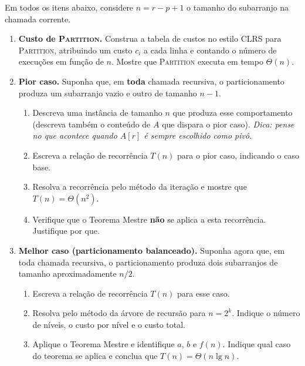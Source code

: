 \documentclass[9pt,a4paper]{extarticle}
\begin{document}
\begin{enumerate}[resume]
    Em todos os itens abaixo, considere $n = r - p + 1$ o tamanho do subarranjo na chamada corrente.

    \begin{enumerate}
        \item \textbf{Custo de \textsc{Partition}.} Construa a tabela de custos no estilo CLRS para \textsc{Partition}, atribuindo um custo $c_i$ a cada linha e contando o número de execuções em função de $n$. Mostre que \textsc{Partition} executa em tempo $\Theta(n)$.

        \item \textbf{Pior caso.} Suponha que, em \textbf{toda} chamada recursiva, o particionamento produza um subarranjo vazio e outro de tamanho $n - 1$.
        \begin{enumerate}
            \item Descreva uma instância de tamanho $n$ que produza esse comportamento (descreva também o conteúdo de $A$ que dispara o pior caso). \textit{Dica: pense no que acontece quando $A[r]$ é sempre escolhido como pivô.}
            \item Escreva a relação de recorrência $T(n)$ para o pior caso, indicando o caso base.
            \item Resolva a recorrência pelo método da iteração e mostre que $T(n) = \Theta(n^2)$.
            \item Verifique que o Teorema Mestre \textbf{não} se aplica a esta recorrência. Justifique por que.
        \end{enumerate}

        \item \textbf{Melhor caso (particionamento balanceado).} Suponha agora que, em toda chamada recursiva, o particionamento produza dois subarranjos de tamanho aproximadamente $n/2$.
        \begin{enumerate}
            \item Escreva a relação de recorrência $T(n)$ para esse caso.
            \item Resolva pelo método da árvore de recursão para $n = 2^k$. Indique o número de níveis, o custo por nível e o custo total.
            \item Aplique o Teorema Mestre e identifique $a$, $b$ e $f(n)$. Indique qual caso do teorema se aplica e conclua que $T(n) = \Theta(n \lg n)$.
        \end{enumerate}


\end{enumerate}
\end{enumerate}
\end{document}
